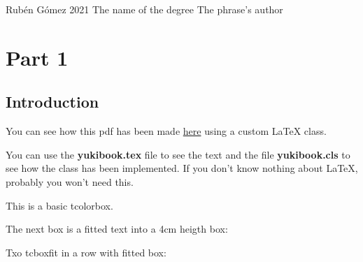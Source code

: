 \documentclass{yukibook}
\begin{document}
  {Rubén Gómez}			%
  {2021}				%
  {The name \linebreak of the degree} %
  {}	%
  {The phrase's author}	%


\part{Part 1}

\chapter{Introduction}
You can see how this pdf has been made \href{https://github.com/yuki/yukibook.cls}{here} using a custom \LaTeX\xspace  class.

You can use the \textbf{yukibook.tex} file to see the text and the file \textbf{yukibook.cls} to see how the class has been implemented. If you don't know nothing about \LaTeX\xspace , probably you won't need this.



\begin{tcolorbox}
This is a basic tcolorbox.

\Blindtext[1]
\end{tcolorbox}

\begin{tcolorbox}[title=Tcolorbox with title]
\Blindtext[1]
\end{tcolorbox}

The next box is a fitted text into a 4cm heigth box:


Txo tcboxfit in a row with fitted box:
\begin{tcbraster}[colback=green!10!white,boxsep=1mm]
\tcboxfit[height=4cm]{\Blindtext[1]}
\tcboxfit[height=4cm]{\Blindtext[1]}
\end{tcbraster}



\Blindtext[1]
\end{document}
